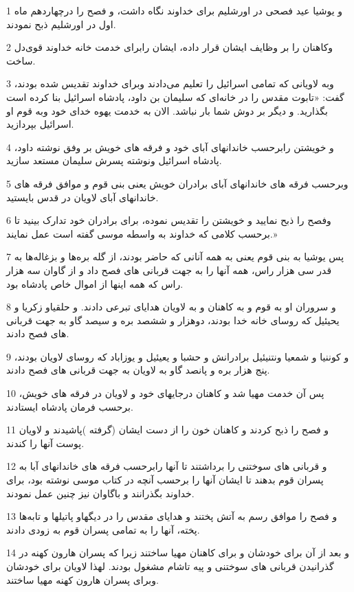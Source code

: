 \par 1 و یوشیا عید فصحی در اورشلیم برای خداوند نگاه داشت، و فصح را درچهاردهم ماه اول در اورشلیم ذبح نمودند.
\par 2 وکاهنان را بر وظایف ایشان قرار داده، ایشان رابرای خدمت خانه خداوند قوی‌دل ساخت.
\par 3 وبه لاویانی که تمامی اسرائیل را تعلیم می‌دادند وبرای خداوند تقدیس شده بودند، گفت: «تابوت مقدس را در خانه‌ای که سلیمان بن داود، پادشاه اسرائیل بنا کرده است بگذارید. و دیگر بر دوش شما بار نباشد. الان به خدمت یهوه خدای خود وبه قوم او اسرائیل بپردازید.
\par 4 و خویشتن رابرحسب خاندانهای آبای خود و فرقه های خویش بر وفق نوشته داود، پادشاه اسرائیل ونوشته پسرش سلیمان مستعد سازید.
\par 5 وبرحسب فرقه های خاندانهای آبای برادران خویش یعنی بنی قوم و موافق فرقه های خاندانهای آبای لاویان در قدس بایستید.
\par 6 وفصح را ذبح نمایید و خویشتن را تقدیس نموده، برای برادران خود تدارک بینید تا برحسب کلامی که خداوند به واسطه موسی گفته است عمل نمایند.»
\par 7 پس یوشیا به بنی قوم یعنی به همه آنانی که حاضر بودند، از گله بره‌ها و بزغاله‌ها به قدر سی هزار راس، همه آنها را به جهت قربانی های فصح داد و از گاوان سه هزار راس که همه اینها از اموال خاص پادشاه بود.
\par 8 و سروران او به قوم و به کاهنان و به لاویان هدایای تبرعی دادند. و حلقیاو زکریا و یحیئیل که روسای خانه خدا بودند، دوهزار و ششصد بره و سیصد گاو به جهت قربانی های فصح دادند.
\par 9 و کوننیا و شمعیا ونتنیئیل برادرانش و حشبا و یعیئیل و یوزاباد که روسای لاویان بودند، پنج هزار بره و پانصد گاو به لاویان به جهت قربانی های فصح دادند.
\par 10 پس آن خدمت مهیا شد و کاهنان درجایهای خود و لاویان در فرقه های خویش، برحسب فرمان پادشاه ایستادند.
\par 11 و فصح را ذبح کردند و کاهنان خون را از دست ایشان (گرفته )پاشیدند و لاویان پوست آنها را کندند.
\par 12 و قربانی های سوختنی را برداشتند تا آنها رابرحسب فرقه های خاندانهای آبا به پسران قوم بدهند تا ایشان آنها را برحسب آنچه در کتاب موسی نوشته بود، برای خداوند بگذرانند و باگاوان نیز چنین عمل نمودند.
\par 13 و فصح را موافق رسم به آتش پختند و هدایای مقدس را در دیگهاو پاتیلها و تابه‌ها پخته، آنها را به تمامی پسران قوم به زودی دادند.
\par 14 و بعد از آن برای خودشان و برای کاهنان مهیا ساختند زیرا که پسران هارون کهنه در گذرانیدن قربانی های سوختنی و پیه تاشام مشغول بودند. لهذا لاویان برای خودشان وبرای پسران هارون کهنه مهیا ساختند.
